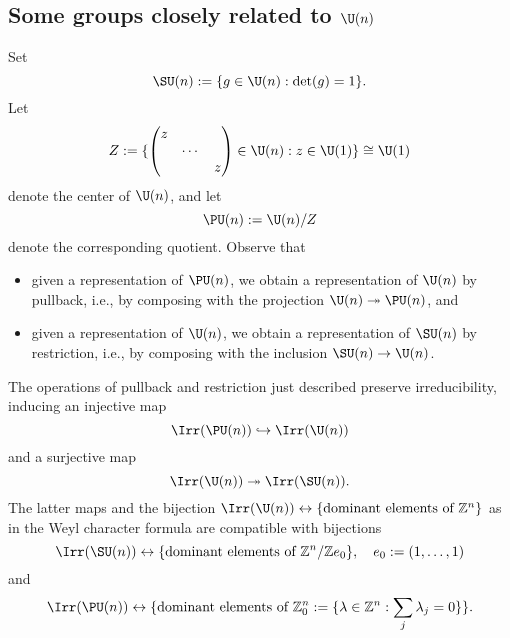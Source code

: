 \documentclass[reqno]{amsart} 
\begin{document}
\subsection{Some groups closely related to \texorpdfstring{$\U(n)$}{U(n)}}\label{sec:some-groups-closely}
Set
\begin{equation}\label{eq:}
  \SU(n) := \{g \in \U(n) : \det(g) = 1 \}.
\end{equation}
Let
\begin{equation}
  Z := \{
\begin{pmatrix}
    z &  &  \\
      & \dotsb  &  \\
      &  & z 
  \end{pmatrix}
 \in \U(n) : z \in \U(1)\} \cong \U(1)
\end{equation}
denote the center of $\U(n)$, and let
\begin{equation}\label{eq:}
  \PU(n) := \U(n)/Z
\end{equation}
denote the corresponding quotient.  Observe that
\begin{itemize}
\item given a representation of $\PU(n)$, we obtain a representation of $\U(n)$ by pullback, i.e., by composing with the projection $\U(n) \twoheadrightarrow \PU(n)$, and
\item given a representation of $\U(n)$, we obtain a representation of $\SU(n)$ by restriction, i.e., by composing with the inclusion $\SU(n) \rightarrow \U(n)$.
\end{itemize}
\begin{theorem}\label{thm:SU-PU}
  The operations of pullback and restriction just described preserve irreducibility, inducing an injective map
  \begin{equation*}
    \Irr(\PU(n)) \hookrightarrow \Irr(\U(n))
  \end{equation*}
  and a surjective map
  \begin{equation*}
    \Irr(\U(n)) \twoheadrightarrow \Irr(\SU(n)).
  \end{equation*}
  The latter maps and the bijection $\Irr(\U(n)) \leftrightarrow \{\text{dominant elements of }\mathbb{Z}^n\}$ as in the Weyl character formula are compatible with bijections
  \begin{equation*}
\Irr(\SU(n))
    \leftrightarrow \{\text{dominant elements of }\mathbb{Z}^n / \mathbb{Z} e_0 \}, \quad e_0 := (1,\dotsc,1)
\end{equation*}
 and 
\begin{equation*}
\Irr(\PU(n)) \leftrightarrow \{\text{dominant elements of }\mathbb{Z}^n_0 := \{\lambda \in \mathbb{Z}^n : \sum_j \lambda_j = 0\} \}.
\end{equation*}
\end{theorem}
\end{document}
